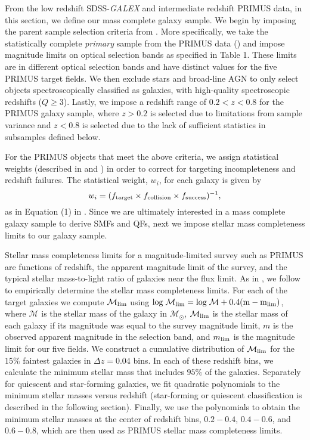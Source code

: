 \documentclass{emulateapj}
\begin{document}
From the low redshift SDSS-{\em GALEX} and intermediate redshift PRIMUS data, in this section, we define our mass complete galaxy sample. We begin by imposing the parent sample selection criteria from \cite{Moustakas:2013aa}. More specifically, we take the statistically complete {\em primary} sample from the PRIMUS data (\citealt{Coil:2011aa}) and impose magnitude limits on optical selection bands as specified in \cite{Moustakas:2013aa} Table 1. These limits are in different optical selection bands and have distinct values for the five PRIMUS target fields. We then exclude stars and broad-line AGN to only select objects spectroscopically classified as galaxies, with high-quality spectroscopic redshifts ($Q \geq 3$). Lastly, we impose a redshift range of $ 0.2 < z < 0.8$ for the PRIMUS galaxy sample, where $ z > 0.2$ is selected due to limitations from sample variance and $ z < 0.8$ is selected due to the lack of sufficient statistics in subsamples defined below. 

For the PRIMUS objects that meet the above criteria, we assign statistical weights (described in \citealt{Coil:2011aa} and \citealt{Cool:2013aa}) in order to correct for targeting incompleteness and redshift failures. The statistical weight, $w_i$, for each galaxy is given by
\begin{equation}
w_{i} = (f_{\rm{target}} \times f_{\rm{collision}} \times f_{\rm{success}})^{-1},
\end{equation}
as in Equation (1) in \cite{Moustakas:2013aa}. Since we are ultimately interested in a mass complete galaxy sample to derive SMFs and QFs, next we impose stellar mass completeness limits to our galaxy sample. 

Stellar mass completeness limits for a magnitude-limited survey such as PRIMUS are functions of redshift, the apparent magnitude limit of the survey, and the typical stellar mass-to-light ratio of galaxies near the flux limit. As in \cite{Moustakas:2013aa}, we follow \cite{Pozzetti:2010aa} to empirically determine the stellar mass completeness limits. For each of the target galaxies we compute $\mathcal{M}_{\rm{lim}}$ using $\rm{log} \; \mathcal{M}_{\mathrm{lim}} = \mathrm{log} \; \mathcal{M} + 0.4 (m - m_{\mathrm{lim}})$, where $\mathcal{M}$ is the stellar mass of the galaxy in $\mathcal{M_{\odot}}$, $\mathcal{M}_{\rm{lim}}$ is the stellar mass of each galaxy if its magnitude was equal to the survey magnitude limit, $m$ is the observed apparent magnitude in the selection band, and $m_{\rm{lim}}$ is the magnitude limit for our five fields. We construct a cumulative distribution of $\mathcal{M}_{\rm{lim}}$ for the $15\%$ faintest galaxies in $\Delta z=0.04$ bins. In each of these redshift bins, we calculate the minimum stellar mass that includes $95 \%$ of the galaxies. Separately for quiescent and star-forming galaxies, we fit quadratic polynomials to the minimum stellar masses versus redshift (star-forming or quiescent classification is described in the following section). Finally, we use the polynomials to obtain the minimum stellar masses at the center of redshift bins, $0.2-0.4$, $0.4-0.6$, and $0.6-0.8$, which are then used as PRIMUS stellar mass completeness limits.
\end{document}
